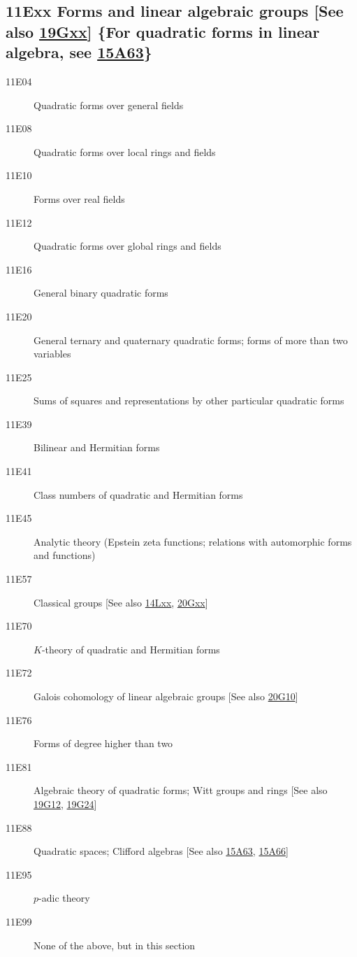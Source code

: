 \subsection*{11Exx  Forms and linear algebraic groups [See also \hyperref[19Gxx]{19Gxx}] \{For quadratic forms in linear algebra, see \hyperref[15A63]{15A63}\} }\label{11Exx}
\begin{description}  
\item [11E04]\label{11E04} Quadratic forms over general fields
\item [11E08]\label{11E08} Quadratic forms over local rings and fields
\item [11E10]\label{11E10} Forms over real fields
\item [11E12]\label{11E12} Quadratic forms over global rings and fields
\item [11E16]\label{11E16} General binary quadratic forms
\item [11E20]\label{11E20} General ternary and quaternary quadratic forms; forms of more than two variables
\item [11E25]\label{11E25} Sums of squares and representations by other particular quadratic forms
\item [11E39]\label{11E39} Bilinear and Hermitian forms
\item [11E41]\label{11E41} Class numbers of quadratic and Hermitian forms
\item [11E45]\label{11E45} Analytic theory (Epstein zeta functions; relations with automorphic forms and functions)
\item [11E57]\label{11E57} Classical groups [See also \hyperref[14Lxx]{14Lxx}, \hyperref[20Gxx]{20Gxx}]
\item [11E70]\label{11E70} $K$-theory of quadratic and Hermitian forms
\item [11E72]\label{11E72} Galois cohomology of linear algebraic groups [See also \hyperref[20G10]{20G10}]
\item [11E76]\label{11E76} Forms of degree higher than two
\item [11E81]\label{11E81} Algebraic theory of quadratic forms; Witt groups and rings [See also \hyperref[19G12]{19G12}, \hyperref[19G24]{19G24}]
\item [11E88]\label{11E88} Quadratic spaces; Clifford algebras [See also \hyperref[15A63]{15A63}, \hyperref[15A66]{15A66}]
\item [11E95]\label{11E95} $p$-adic theory
\item [11E99]\label{11E99} None of the above, but in this section
\end{description}
